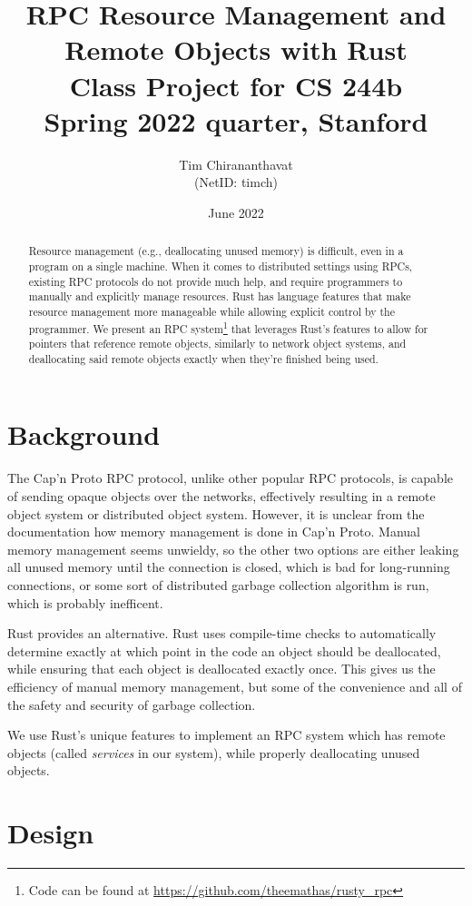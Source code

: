 \documentclass[11pt, twocolumn]{article}
\title{%
    RPC Resource Management and Remote Objects with Rust \\
    \Large Class Project for CS 244b \\
    Spring 2022 quarter, Stanford
}
\author{Tim Chirananthavat \\ (NetID: timch)}
\date{June 2022}
\begin{document}
\maketitle

\begin{abstract}
    Resource management (e.g., deallocating unused memory) is difficult, even in a program on a single machine. When it comes to distributed settings using RPCs, existing RPC protocols do not provide much help, and require programmers to manually and explicitly manage resources. Rust has language features that make resource management more manageable while allowing explicit control by the programmer. We present an RPC system\footnote{Code can be found at \url{https://github.com/theemathas/rusty_rpc}} that leverages Rust's features to allow for pointers that reference remote objects, similarly to network object systems, and deallocating said remote objects exactly when they're finished being used.
\end{abstract}

\section{Background}

The Cap'n Proto RPC protocol\cite{capnproto}, unlike other popular RPC protocols, is capable of sending opaque objects over the networks, effectively resulting in a remote object system or distributed object system. However, it is unclear from the documentation how memory management is done in Cap'n Proto. Manual memory management seems unwieldy, so the other two options are either leaking all unused memory until the connection is closed, which is bad for long-running connections, or some sort of distributed garbage collection algorithm is run, which is probably inefficent.

Rust provides an alternative. Rust uses compile-time checks to automatically determine exactly at which point in the code an object should be deallocated, while ensuring that each object is deallocated exactly once. This gives us the efficiency of manual memory management, but some of the convenience and all of the safety and security of garbage collection.

We use Rust's unique features to implement an RPC system which has remote objects (called \textit{services} in our system), while properly deallocating unused objects.

\section{Design}
\end{document}
